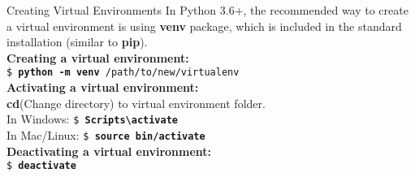     \begin{frame}{Creating Virtual Environments}
        \LARGE
        \pause
        In Python 3.6+, the recommended way to create a virtual environment is using \textbf{venv} package, which is included in the standard installation (similar to \textbf{pip}).\\
        \pause
        \textbf{Creating a virtual environment:}\\
        \texttt{\$ \textbf{python -m venv} /path/to/new/virtualenv}\\
        \pause
        \textbf{Activating a virtual environment:}\\
        \textbf{cd}(Change directory) to virtual environment folder.\\
        In Windows: \texttt{\$ \textbf{Scripts\textbackslash activate}}\\
        In Mac/Linux: \texttt{\$ \textbf{source bin/activate}}\\
        \pause
        \textbf{Deactivating a virtual environment:}\\
        \texttt{\$ \textbf{deactivate}}
    \end{frame}
    
